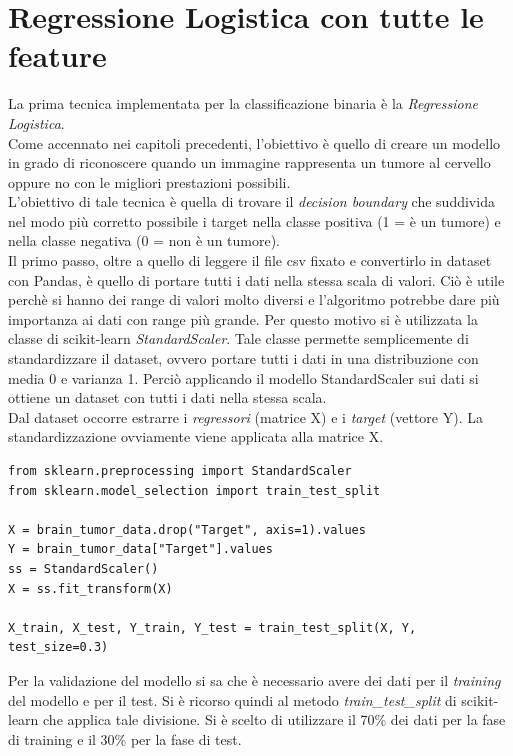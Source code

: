 \section{Regressione Logistica con tutte le feature}
La prima tecnica implementata per la classificazione binaria è la \textit{Regressione Logistica}.\\
Come accennato nei capitoli precedenti, l'obiettivo è quello di creare un modello in grado di riconoscere quando un immagine rappresenta un tumore al cervello oppure no con le migliori prestazioni possibili.\\
L'obiettivo di tale tecnica è quella di trovare il \textit{decision boundary} che suddivida nel modo più corretto possibile i target nella classe positiva (1 = è un tumore) e nella classe negativa (0 = non è un tumore).\\
Il primo passo, oltre a quello di leggere il file csv fixato e convertirlo in dataset con Pandas, è quello di portare tutti i dati nella stessa scala di valori. Ciò è utile perchè si hanno dei range di valori molto diversi e l'algoritmo potrebbe dare più importanza ai dati con range più grande. Per questo motivo si è utilizzata la classe di scikit-learn \textit{StandardScaler}. Tale classe permette semplicemente di standardizzare il dataset, ovvero portare tutti i dati in una distribuzione con media 0 e varianza 1. Perciò applicando il modello StandardScaler sui dati si ottiene un dataset con tutti i dati nella stessa scala.\\
Dal dataset occorre estrarre i \textit{regressori} (matrice X) e i \textit{target} (vettore Y). La standardizzazione ovviamente viene applicata alla matrice X.\\
\begin{lstlisting}
from sklearn.preprocessing import StandardScaler
from sklearn.model_selection import train_test_split

X = brain_tumor_data.drop("Target", axis=1).values
Y = brain_tumor_data["Target"].values
ss = StandardScaler()
X = ss.fit_transform(X)

X_train, X_test, Y_train, Y_test = train_test_split(X, Y, test_size=0.3)
\end{lstlisting}
Per la validazione del modello si sa che è necessario avere dei dati per il \textit{training} del modello e per il test. Si è ricorso quindi al metodo \textit{train\_test\_split} di scikit-learn che applica tale divisione. Si è scelto di utilizzare il 70\% dei dati per la fase di training e il 30\% per la fase di test.\\
